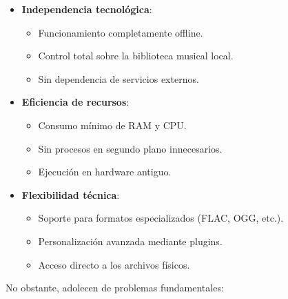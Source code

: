 \documentclass[11pt, a4paper]{article}
\begin{document}
\begin{itemize}
    \item \textbf{Independencia tecnológica}:
    \begin{itemize}
        \item Funcionamiento completamente offline.
        \item Control total sobre la biblioteca musical local.
        \item Sin dependencia de servicios externos.
    \end{itemize}
    
    \item \textbf{Eficiencia de recursos}:
    \begin{itemize}
        \item Consumo mínimo de RAM y CPU.
        \item Sin procesos en segundo plano innecesarios.
        \item Ejecución en hardware antiguo.
    \end{itemize}
    
    \item \textbf{Flexibilidad técnica}:
    \begin{itemize}
        \item Soporte para formatos especializados (FLAC, OGG, etc.).
        \item Personalización avanzada mediante plugins.
        \item Acceso directo a los archivos físicos.
    \end{itemize}
\end{itemize}

No obstante, adolecen de problemas fundamentales:
\end{document}
